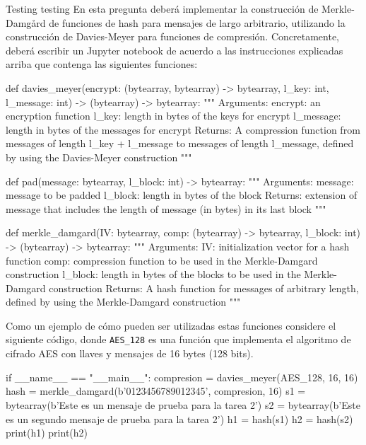 
Testing testing
En esta pregunta deberá implementar la construcción de Merkle-Damgård
de funciones de hash para mensajes de largo arbitrario, utilizando la
construcción de Davies-Meyer para funciones de
compresión. Concretamente, deberá escribir un Jupyter notebook de
acuerdo a las instrucciones explicadas arriba que contenga las
siguientes funciones:
\begin{python}
def davies_meyer(encrypt: (bytearray, bytearray) -> bytearray,
                 l_key: int, l_message: int) -> (bytearray) -> bytearray:
    """
    Arguments:
      encrypt: an encryption function
      l_key: length in bytes of the keys for encrypt
      l_message: length in bytes of the messages for encrypt
    Returns:
      A compression function from messages of length l_key + l_message to
      messages of length l_message, defined by using the Davies-Meyer
      construction   
    """
\end{python}

\begin{python}
def pad(message: bytearray, l_block: int) -> bytearray:
    """
    Arguments:
      message: message to be padded
      l_block: length in bytes of the block
    Returns:
      extension of message that includes the length of message
      (in bytes) in its last block
    """
\end{python}

\begin{python}
def merkle_damgard(IV: bytearray, comp: (bytearray) -> bytearray,
                   l_block: int) -> (bytearray) -> bytearray:
    """
    Arguments:
      IV: initialization vector for a hash function
      comp: compression function to be used in the Merkle-Damgard
      construction
      l_block: length in bytes of the blocks to be used in the Merkle-Damgard
      construction
    Returns:
      A hash function for messages of arbitrary length, defined by using
      the Merkle-Damgard construction
    """
\end{python}    
Como un ejemplo de cómo pueden ser utilizadas estas funciones
considere el siguiente código, donde \verb+AES_128+ es una función que
implementa el algoritmo de cifrado AES con llaves y mensajes de 16
bytes (128 bits).
\begin{python}
if __name__ == "__main__":
    compresion = davies_meyer(AES_128, 16, 16)
    hash = merkle_damgard(b'0123456789012345', compresion, 16)
    s1 = bytearray(b'Este es un mensaje de prueba para la tarea 2')
    s2 = bytearray(b'Este es un segundo mensaje de prueba para la tarea 2')
    h1 = hash(s1)
    h2 = hash(s2)
    print(h1)
    print(h2)
\end{python}    

